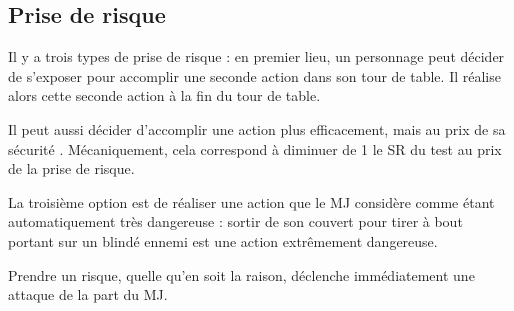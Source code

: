 \documentclass{report}
\begin{document}
\begin{multicols}{2}
\subsection{Prise de risque}
\label{risque}
Il y a trois types de prise de risque : en premier lieu, un personnage peut décider de s'exposer pour accomplir une seconde action dans son tour de table. Il réalise alors cette seconde action à la fin du tour de table.

Il peut aussi décider d'accomplir une action plus efficacement, mais au prix de sa sécurité . Mécaniquement, cela correspond à diminuer de 1 le SR du test au prix de la prise de risque.

La troisième option est de réaliser une action que le MJ considère comme étant automatiquement très dangereuse : sortir de son couvert pour tirer à bout portant sur un blindé ennemi est une action extrêmement dangereuse.

Prendre un risque, quelle qu'en soit la raison, déclenche immédiatement une attaque de la part du MJ.

\end{multicols}
\end{document}
